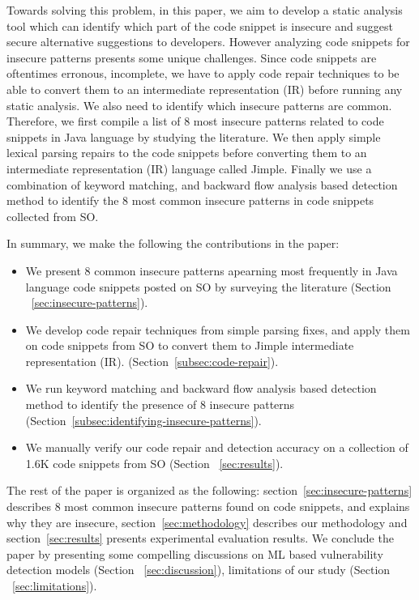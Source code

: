    Towards solving this problem, in this paper, we aim to develop a static analysis tool  which can identify which part of the code snippet is insecure 
   and suggest secure alternative suggestions to developers. However analyzing code snippets for insecure patterns presents some unique challenges. 
   Since  code snippets are
   oftentimes erronous, incomplete, we have to apply code repair techniques to be able to convert them to an intermediate representation (IR) 
   before running any static analysis. We also need to identify which insecure patterns are common.%
   Therefore, we first compile a list of 8 most insecure patterns related to code snippets in Java language by studying the literature. 
   We then apply simple lexical parsing repairs to the code snippets before converting them to an intermediate representation (IR) language called Jimple. 
   Finally we use a combination of keyword matching, and backward flow analysis based detection method to identify 
   the 8 most common insecure patterns in code snippets collected from SO.
   
   
   In summary, we make the following the contributions in the paper: 
   \begin{itemize}
   \item We present 8 common insecure patterns apearning most frequently  in Java language code snippets posted on 
   SO by surveying the literature (Section ~\ref{sec:insecure-patterns}).      
   \item We develop code repair techniques from simple parsing fixes, and apply them on code snippets 
   from SO to convert them to Jimple intermediate representation (IR). %
   (Section~\ref{subsec:code-repair}). 
   \item  We run keyword matching and backward flow analysis based detection method to identify the presence of 8 insecure patterns 
   (Section~\ref{subsec:identifying-insecure-patterns}).
   \item We manually verify our code repair and detection accuracy on a collection of 1.6K code snippets from SO (Section ~\ref{sec:results}). 
   \end{itemize}

   The rest of the paper is organized as the following: section~\ref{sec:insecure-patterns} describes 8 most common 
   insecure patterns found on code snippets, and explains why they are insecure, section~\ref{sec:methodology} describes 
   our methodology and section~\ref{sec:results} presents experimental evaluation results. 
   We conclude the paper by presenting some compelling discussions on ML based vulnerability detection models (Section ~\ref{sec:discussion}), 
   limitations of our study (Section ~\ref{sec:limitations}). %

